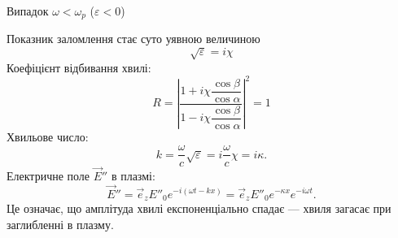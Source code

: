 \documentclass[]{beamer}
\begin{document}
\begin{frame}{Випадок $ \omega < \omega_p$ ($\varepsilon < 0$)}{}
	\begin{block}{}\small\justifying
		Показник заломлення стає суто уявною величиною
		\begin{equation*}
			\sqrt{\varepsilon} = i\chi
		\end{equation*}
		Коефіцієнт відбивання хвилі:
		\begin{equation*}
			R = \left|\frac{1 + i\chi \dfrac{\cos \beta}{\cos \alpha} }{1 - i\chi \dfrac{\cos \beta}{\cos \alpha}}\right|^2 = 1
		\end{equation*}
		Хвильове число:
		\begin{equation*}
			k = \frac{\omega}{c}\sqrt{\varepsilon} = i \frac{\omega}{c}\chi = i\kappa.
		\end{equation*}
		Електричне поле $\vec{E}''$ в плазмі:
		\begin{equation*}
			\vec{E}'' = \vec{e}_z E''_0  e^{-i(\omega t - kx)} = \vec{e}_z E''_0e^{-\kappa x}  e^{-i\omega t}.
		\end{equation*}
		Це означає, що амплітуда хвилі експоненціально спадає --- хвиля
		загасає при заглибленні в плазму.
	\end{block}
\end{frame}
\end{document}

